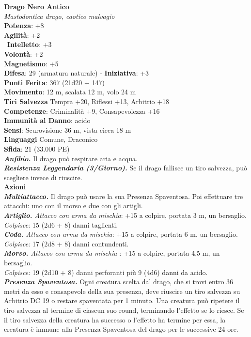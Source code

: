 \begin{multicols}{2}
\medskip\textbf{Drago Nero Antico}\\
\emph{Mastodontica drago, caotico malvagio}\\
\textbf{Potenza}: +8\\
\textbf{Agilità}: +2\\\
\textbf{Intelletto}: +3\\
\textbf{Volontà}: +2\\
\textbf{Magnetismo}: +5\\
\textbf{Difesa}: 29 (armatura naturale) - \textbf{Iniziativa}: +3\\
\textbf{Punti Ferita}: 367 (21d20 + 147)\\
\textbf{Movimento}: 12 m, scalata 12 m, volo 24 m\\
\textbf{Tiri Salvezza} Tempra +20, Riflessi +13, Arbitrio +18\\
\textbf{Competenze}: Criminalità +9, Consapevolezza +16\\
\textbf{Immunità al Danno}: acido\\
\textbf{Sensi}: Scurovisione 36 m, vista cieca 18 m\\
\textbf{Linguaggi} Comune, Draconico\\
\textbf{Sfida}: 21 (33.000 PE)\smallskip\\
\emph{\textbf{Anfibio.}} Il drago può respirare aria e acqua.\\
\emph{\textbf{Resistenza Leggendaria (3/Giorno).}} Se il drago fallisce un tiro salvezza, può scegliere invece di riuscire.\\
\smallskip\textbf{Azioni}\\
\emph{\textbf{Multiattacco.}} Il drago può usare la sua Presenza Spaventosa. Poi effettuare tre attacchi: uno con il morso e due con gli artigli.\\
\emph{\textbf{Artiglio.} Attacco con arma da mischia}: +15 a colpire, portata 3 m, un bersaglio.\\
\emph{Colpisce:} 15 (2d6 + 8) danni taglienti.\\
\emph{\textbf{Coda.} Attacco con arma da mischia}: +15 a colpire, portata 6 m, un bersaglio.\\
\emph{Colpisce:} 17 (2d8 + 8) danni contundenti.\\
\emph{\textbf{Morso.} Attacco con arma da mischia} : +15 a colpire, portata 4,5 m, un bersaglio.\\
\emph{Colpisce:} 19 (2d10 + 8) danni perforanti più 9 (4d6) danni da acido.\\
\emph{\textbf{Presenza Spaventosa.}} Ogni creatura scelta dal drago, che si trovi entro 36 metri da esso e consapevole della sua presenza, deve riuscire un tiro salvezza su Arbitrio DC 19 o restare spaventata per 1 minuto. Una creatura può ripetere il tiro salvezza al termine di ciascun suo round, terminando l'effetto se lo riesce. Se il tiro salvezza della creatura ha successo o l'effetto ha termine per essa, la creatura è immune alla Presenza Spaventosa del drago per le successive 24 ore.\\

\end{multicols}
